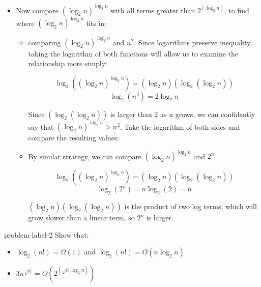 \documentclass[letterpaper, 11pt]{extarticle}
\begin{document}
\begin{itemize}

    \item Now compare $(\log_2 n)^{\log_2 n}$ with all terms greater than $2^{(\log_2n)}$, to find where $(\log_2 n)^{\log_2 n}$ fits in:

    \begin{itemize}
        \item comparing $(\log_2 n)^{\log_2 n}$ and $n^2$. Since logarithms preserve inequality, taking the logarithm of both functions will allow us to examine the relationship more simply:

        $$\log_2((\log_2 n)^{\log_2 n}) = (\log_2 n) (\log_2(\log_2 n))$$
        $$\log_2(n^2) = 2\log_2 n$$

        Since $(\log_2(\log_2 n))$ is larger than $2$ as n grows, we can confidently say that $(\log_2 n)^{\log_2 n} > n^2$. Take the logarithm of both sides and compare the resulting values:

        \item By similar strategy, we can compare $(\log_2 n)^{\log_2 n}$ and $2^n$

        $$\log_2((\log_2 n)^{\log_2 n}) = (\log_2 n) (\log_2(\log_2 n))$$
        $$\log_2(2^n) = n \log_2(2) = n$$

        $(\log_2 n) (\log_2(\log_2 n))$ is the product of two log terms, which will grow slower than a linear term, so $2^n$ is larger.
        
    \end{itemize}
    
\end{itemize}





\begin{problem}{}{problem-label-2}
    Show that:
    \begin{itemize}
        \item $\log_{2}(n!) = \Omega(1)$ and $\log_{2}(n!) = O(n \log_{2}n)$
        \item $3n^{\sqrt{n}} = \Theta(2^{(\sqrt{n} \log_{2}n)})$
    \end{itemize}
\end{problem}
\end{document}
